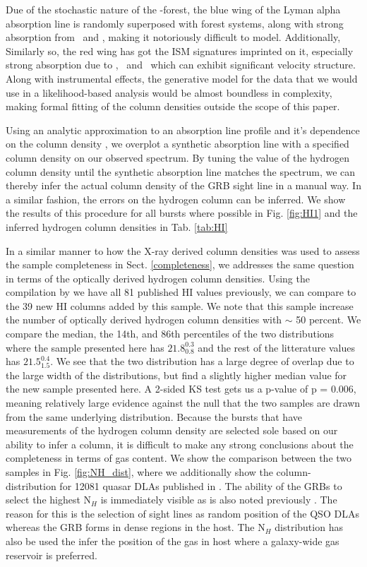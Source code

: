 \documentclass{aa}    %
\begin{document}
Due of the stochastic nature of the \lya-forest, the blue wing of the Lyman
alpha absorption line is randomly superposed with forest systems, along with
strong absorption from \mnii~and \SIiii, making it notoriously difficult to
model. Additionally, Similarly so, the red wing has got the ISM signatures
imprinted on it, especially strong absorption due to \SIii, \sii~and \nv~which
can exhibit significant velocity structure. Along with instrumental effects, the
generative model for the data that we would use in a likelihood-based analysis
would be almost boundless in complexity, making formal fitting of the column
densities outside the scope of this paper.

Using an analytic approximation to an absorption line profile and it's
dependence on the column density \citep{TepperGarcia2006}, we overplot a
synthetic absorption line with a specified column density on our observed
spectrum. By tuning the value of the hydrogen column density until the synthetic
absorption line matches the spectrum, we can thereby infer the actual column
density of the GRB sight line in a manual way. In a similar fashion, the errors
on the hydrogen column can be inferred. We show the results of this procedure
for all bursts where possible in Fig. \ref{fig:HI1} and the inferred hydrogen
column densities in Tab. \ref{tab:HI}



In a similar manner to how the X-ray derived column densities was used to assess
the sample completeness in Sect. \ref{completeness}, we addresses the same
question in terms of the optically derived hydrogen column densities. Using the
compilation by \citet{Tanvir2017} we have all 81 published HI values previously,
we can compare to the 39 new HI columns added by this sample. We note that this
sample increase the number of optically derived hydrogen column densities with
$\sim$ 50 percent. We compare the median, the 14th, and 86th percentiles of the
two distributions where the sample presented here has $21.8_{0.8}^{0.3}$ and the
rest of the litterature values has $21.5_{1.5}^{0.4}$. We see that the two
distribution has a large degree of overlap due to the large width of the
distributions, but find a slightly higher median value for the new sample
presented here. A 2-sided KS test gets us a p-value of p = 0.006, meaning
relatively large evidence against the null that the two samples are drawn from
the same underlying distribution. Because the bursts that have measurements of
the hydrogen column density are selected sole based on our ability to infer a
column, it is difficult to make any strong conclusions about the completeness in
terms of gas content. We show the comparison between the two samples in Fig.
\ref{fig:NH_dist}, where we additionally show the column-distribution for 12081
quasar DLAs published in \citet{Noterdaeme2012b}. The ability of the GRBs to
select the highest N$_H$ is immediately visible as is also noted previously
\citep{Prochaska2007, Fynbo2009}. The reason for this is the selection of sight
lines as random position of the QSO DLAs whereas the GRB forms in dense regions
in the host. The N$_H$ distribution has also be used the infer the position of
the gas in host \cite{Buchner2016} where a galaxy-wide gas reservoir is
preferred.
\end{document}
